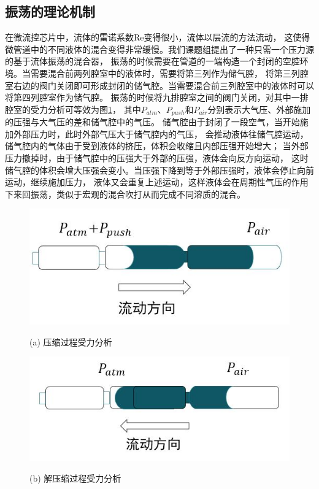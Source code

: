 \subsection{振荡的理论机制}
	在微流控芯片中，流体的雷诺系数Re变得很小，流体以层流的方法流动，
	这使得微管道中的不同液体的混合变得非常缓慢。我们课题组提出了一种只需一个压力源的基于流体振荡的混合器\cite{cheng2018simple}，
	振荡的时候需要在管道的一端构造一个封闭的空腔环境。当需要混合前两列腔室中的液体时，需要将第三列作为储气腔，
	将第三列腔室右边的阀门关闭即可形成封闭的储气腔。当需要混合前三列腔室中的液体时可以将第四列腔室作为储气腔。
	振荡的时候将九排腔室之间的阀门关闭，对其中一排腔室的受力分析可等效为图\ref{fig:force}，
	其中$P_{atm}$、$P_{push}$和$P_{air}$分别表示大气压、外部施加的压强与大气压的差和储气腔中的气压。
	储气腔由于封闭了一段空气，当开始施加外部压力时，此时外部气压大于储气腔内的气压，
	会推动液体往储气腔运动，储气腔内的气体由于受到液体的挤压，体积会收缩且内部压强开始增大；
	当外部压力撤掉时，由于储气腔中的压强大于外部的压强，液体会向反方向运动，
	这时储气腔的体积会增大压强会变小。当压强下降到等于外部压强时，液体会停止向前运动，继续施加压力，
	液体又会重复上述运动，这样液体会在周期性气压的作用下来回振荡，类似于宏观的混合吹打从而完成不同溶质的混合。
	\begin{figure}[!htp]    
	\begin{minipage}[t]{0.5\linewidth}%
		\centering    
		\includegraphics[width=1\linewidth]{figure/chap2/force2.jpg}    
		\caption*{(a) 压缩过程受力分析}%
		\label{fig:compress}    
	\end{minipage}    
	\begin{minipage}[t]{0.5\linewidth}%
		\centering    
		\includegraphics[width=1\linewidth]{figure/chap2/force1.jpg}    
		\caption*{(b) 解压缩过程受力分析}
		\label{fig:decompress}
	\end{minipage}
	\label{fig:force}
	\end{figure}
	
